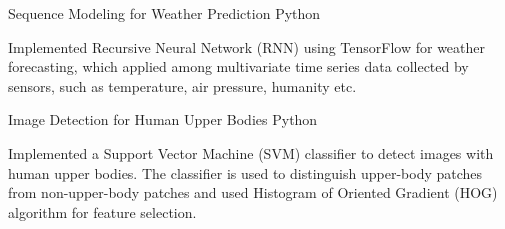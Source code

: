 \begin{cventries}

\projentry
{Sequence Modeling for Weather Prediction} %
{Python} %
{ %
\begin{cvitems}
\item{Implemented Recursive Neural Network ({RNN}) using TensorFlow for weather forecasting, which applied among multivariate time series data collected by sensors, such as temperature, air pressure, humanity etc.}
\end{cvitems}
}


\projentry
{Image Detection for Human Upper Bodies} %
{Python} %
{
\begin{cvitems}
\item{Implemented a Support Vector Machine ({SVM}) classifier to detect images with human upper bodies. The classifier is used to distinguish upper-body patches from non-upper-body patches and used Histogram of Oriented Gradient (HOG) algorithm for feature selection.}
\end{cvitems}
}







\end{cventries}
